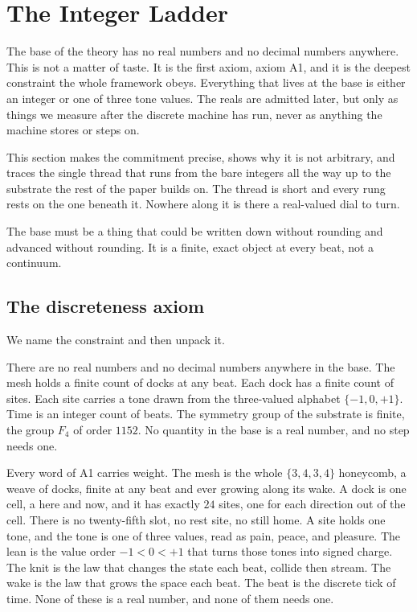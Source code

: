 \section{The Integer Ladder}

The base of the theory has no real numbers and no decimal numbers anywhere. This is not a matter of taste. It is the first axiom, axiom A1, and it is the deepest constraint the whole framework obeys. Everything that lives at the base is either an integer or one of three tone values. The reals are admitted later, but only as things we measure after the discrete machine has run, never as anything the machine stores or steps on.

This section makes the commitment precise, shows why it is not arbitrary, and traces the single thread that runs from the bare integers all the way up to the substrate the rest of the paper builds on. The thread is short and every rung rests on the one beneath it. Nowhere along it is there a real-valued dial to turn.

\begin{principle}
The base must be a thing that could be written down without rounding and advanced without rounding. It is a finite, exact object at every beat, not a continuum.
\end{principle}

\subsection{The discreteness axiom}

We name the constraint and then unpack it.

\begin{axiom}[A1, Discrete]
There are no real numbers and no decimal numbers anywhere in the base. The mesh holds a finite count of docks at any beat. Each dock has a finite count of sites. Each site carries a tone drawn from the three-valued alphabet $\{-1, 0, +1\}$. Time is an integer count of beats. The symmetry group of the substrate is finite, the group $F_4$ of order $1152$. No quantity in the base is a real number, and no step needs one.
\end{axiom}

Every word of A1 carries weight. The mesh is the whole $\{3,4,3,4\}$ honeycomb, a weave of docks, finite at any beat and ever growing along its wake. A dock is one cell, a here and now, and it has exactly $24$ sites, one for each direction out of the cell. There is no twenty-fifth slot, no rest site, no still home. A site holds one tone, and the tone is one of three values, read as pain, peace, and pleasure. The lean is the value order $-1 < 0 < +1$ that turns those tones into signed charge. The knit is the law that changes the state each beat, collide then stream. The wake is the law that grows the space each beat. The beat is the discrete tick of time. None of these is a real number, and none of them needs one.

